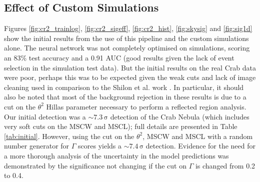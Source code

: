 \subsection{Effect of Custom Simulations}
Figures \ref{fig:cr2_trainlog}, \ref{fig:cr2_sigeff}, \ref{fig:cr2_hist}, \ref{fig:skysig} and \ref{fig:sig1d} show the initial results from the use of this pipeline and the custom simulations alone. The neural network was not completely optimised on simulations, scoring an 83\% test accuracy and a 0.91 AUC (good results given the lack of event selection in the simulation test data). But the initial results on the real Crab data were poor, perhaps this was to be expected given the weak cuts and lack of image cleaning used in comparison to the Shilon et al. work \cite{Shilon}. In particular, it should also be noted that most of the background rejection in these results is due to a cut on the $\theta^2$ Hillas parameter necessary to perform a reflected region analysis. Our initial detection was a $\mathrm{\sim7.3\,\sigma}$ detection  of the Crab Nebula (which includes very soft cuts on the MSCW and MSCL); full details are presented in Table \ref{tab:initial}. However, using the cut on the $\theta^2$, MSCW and MSCL with a random number generator for $\Gamma$ scores yields a $\mathrm{\sim7.4\,\sigma}$ detection. Evidence for the need for a more thorough analysis of the  uncertainty in the model predictions was demonstrated by the significance not changing if the cut on $\Gamma$ is changed from 0.2 to 0.4.

\begin{table}[h]
    \centering
    \caption{Anasum output for custom simulations alone run.}
    \label{tab:initial}
\end{table}

